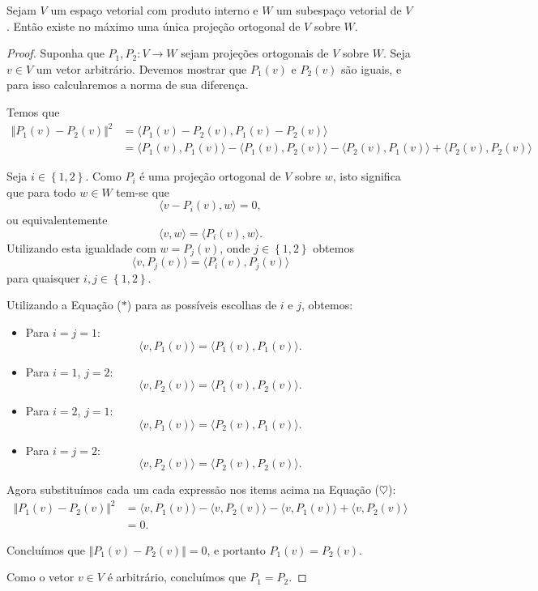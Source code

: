 \begin{theorem}
Sejam $V$ um espaço vetorial com produto interno e $W$ um subespaço vetorial de $V$. Então existe no máximo uma única projeção ortogonal de $V$ sobre $W$.
\end{theorem}

\begin{proof}
	Suponha que $P_1,P_2\colon V\to W$ sejam projeções ortogonais de $V$ sobre $W$. Seja $v\in V$ um vetor arbitrário. Devemos mostrar que $P_1(v)$ e $P_2(v)$ são iguais, e para isso calcularemos a norma de sua diferença.
	
	Temos que
	\begin{align*}
	\Vert P_1(v)-P_2(v)\Vert^2&=\langle P_1(v)-P_2(v),P_1(v)-P_2(v)\rangle\\
	&=\langle P_1(v),P_1(v)\rangle-\langle P_1(v),P_2(v)\rangle-\langle P_2(v),P_1(v)\rangle+\langle P_2(v),P_2(v)\rangle\tag{$\heartsuit$}
	\end{align*}
	
	Seja $i\in\left\{1,2\right\}$. Como $P_i$ é uma projeção ortogonal de $V$ sobre $w$, isto significa que para todo $w\in W$ tem-se que
	\[\langle v-P_i(v),w\rangle=0,\]
	ou equivalentemente
	\[\langle v,w\rangle=\langle P_i(v),w\rangle.\]
	Utilizando esta igualdade com $w=P_j(v)$, onde $j\in\left\{1,2\right\}$ obtemos
	\[\langle v,P_j(v)\rangle=\langle P_i(v),P_j(v)\rangle\tag{$*$}\]
	para quaisquer $i,j\in\left\{1,2\right\}$. 
	
	Utilizando a Equação ($*$) para as possíveis escolhas de $i$ e $j$, obtemos:
	\begin{itemize}
		\item Para $i=j=1$:
		\[\langle v,P_1(v)\rangle=\langle P_1(v),P_1(v)\rangle.\]
		\item Para $i=1$, $j=2$:
		\[\langle v,P_2(v)\rangle=\langle P_1(v),P_2(v)\rangle.\]
		\item Para $i=2$, $j=1$:
		\[\langle v,P_1(v)\rangle=\langle P_2(v),P_1(v)\rangle.\]
		\item Para $i=j=2$:
		\[\langle v,P_2(v)\rangle=\langle P_2(v),P_2(v)\rangle.\]
	\end{itemize}
	
	Agora substituímos cada um cada expressão nos items acima na Equação ($\heartsuit$):
	\begin{align*}
	\Vert P_1(v)-P_2(v)\Vert^2
		&=\langle v,P_1(v)\rangle-\langle v,P_2(v)\rangle-\langle v,P_1(v)\rangle +\langle v,P_2(v)\rangle\\
		&=0.
	\end{align*}
	
	Concluímos que $\Vert P_1(v)-P_2(v)\Vert=0$, e portanto $P_1(v)=P_2(v)$.
	
	Como o vetor $v\in V$ é arbitrário, concluímos que $P_1=P_2$.
\end{proof}